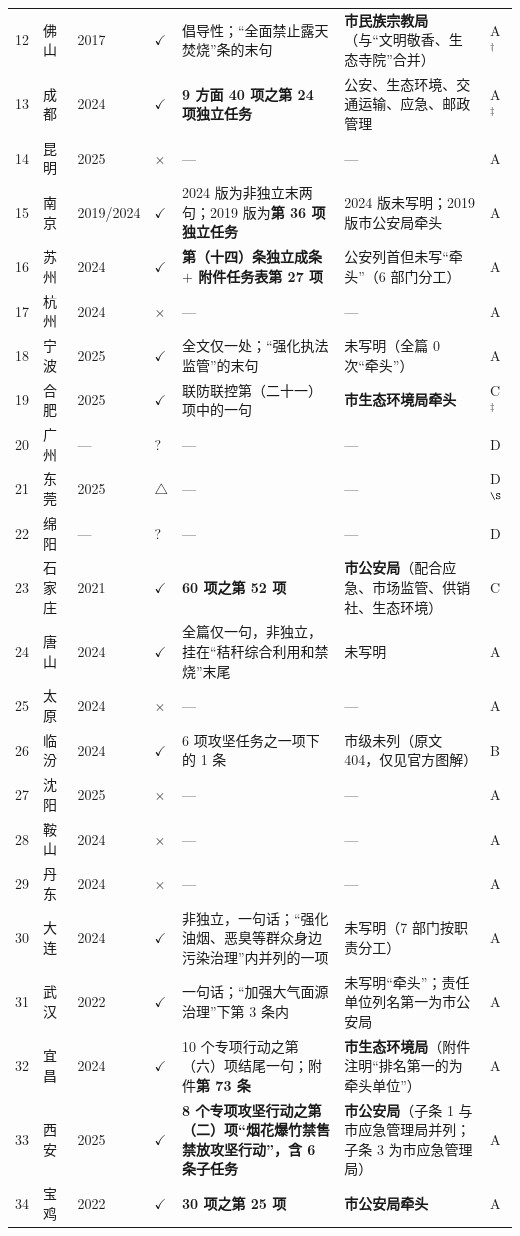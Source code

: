 \begin{longtable}{@{}R{0.55cm}L{1.15cm}L{1.35cm}C{0.85cm}L{4.35cm}L{4.45cm}C{1.2cm}@{}}
12 & 佛山 & 2017 & $\checkmark$ & 倡导性；“全面禁止露天焚烧”条的末句 & \textbf{市民族宗教局}（与“文明敬香、生态寺院”合并） & A$^{\dagger}$ \\
13 & 成都 & 2024 & $\checkmark$ & \textbf{9 方面 40 项之第 24 项独立任务} & 公安、生态环境、交通运输、应急、邮政管理 & A$^{\ddagger}$ \\
14 & 昆明 & 2025 & $\times$ & — & — & A \\
15 & 南京 & 2019\slash2024 & $\checkmark$ & 2024 版为非独立末两句；2019 版为\textbf{第 36 项独立任务} & 2024 版未写明；2019 版市公安局牵头 & A \\
16 & 苏州 & 2024 & $\checkmark$ & \textbf{第（十四）条独立成条 $+$ 附件任务表第 27 项} & 公安列首但未写“牵头”（6 部门分工） & A \\
17 & 杭州 & 2024 & $\times$ & — & — & A \\
18 & 宁波 & 2025 & $\checkmark$ & 全文仅一处；“强化执法监管”的末句 & 未写明（全篇 0 次“牵头”） & A \\
19 & 合肥 & 2025 & $\checkmark$ & 联防联控第（二十一）项中的一句 & \textbf{市生态环境局牵头} & C$^{\ddagger}$ \\
20 & 广州 & — & ? & — & — & D \\
21 & 东莞 & 2025 & $\triangle$ & — & — & D$^{\S}$ \\
22 & 绵阳 & — & ? & — & — & D \\
23 & 石家庄 & 2021 & $\checkmark$ & \textbf{60 项之第 52 项} & \textbf{市公安局}（配合应急、市场监管、供销社、生态环境） & C \\
24 & 唐山 & 2024 & $\checkmark$ & 全篇仅一句，非独立，挂在“秸秆综合利用和禁烧”末尾 & 未写明 & A \\
25 & 太原 & 2024 & $\times$ & — & — & A \\
26 & 临汾 & 2024 & $\checkmark$ & 6 项攻坚任务之一项下的 1 条 & 市级未列（原文 404，仅见官方图解） & B \\
27 & 沈阳 & 2025 & $\times$ & — & — & A \\
28 & 鞍山 & 2024 & $\times$ & — & — & A \\
29 & 丹东 & 2024 & $\times$ & — & — & A \\
30 & 大连 & 2024 & $\checkmark$ & 非独立，一句话；“强化油烟、恶臭等群众身边污染治理”内并列的一项 & 未写明（7 部门按职责分工） & A \\
31 & 武汉 & 2022 & $\checkmark$ & 一句话；“加强大气面源治理”下第 3 条内 & 未写明“牵头”；责任单位列名第一为市公安局 & A \\
32 & 宜昌 & 2024 & $\checkmark$ & 10 个专项行动之第（六）项结尾一句；附件\textbf{第 73 条} & \textbf{市生态环境局}（附件注明“排名第一的为牵头单位”） & A \\
33 & 西安 & 2025 & $\checkmark$ & \textbf{8 个专项攻坚行动之第（二）项“烟花爆竹禁售禁放攻坚行动”，含 6 条子任务} & \textbf{市公安局}（子条 1 与市应急管理局并列；子条 3 为市应急管理局） & A \\
34 & 宝鸡 & 2022 & $\checkmark$ & \textbf{30 项之第 25 项} & \textbf{市公安局牵头} & A \\
\end{longtable}

